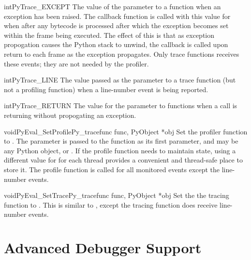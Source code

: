 \begin{cvardesc}{int}{PyTrace_EXCEPT}
  The value of the  parameter to a 
  function when an exception has been raised.  The callback function
  is called with this value for  when after any bytecode is
  processed after which the exception becomes set within the frame
  being executed.  The effect of this is that as exception propogation
  causes the Python stack to unwind, the callback is called upon
  return to each frame as the exception propagates.  Only trace
  functions receives these events; they are not needed by the
  profiler.
\end{cvardesc}

\begin{cvardesc}{int}{PyTrace_LINE}
  The value passed as the  parameter to a trace function
  (but not a profiling function) when a line-number event is being
  reported.
\end{cvardesc}

\begin{cvardesc}{int}{PyTrace_RETURN}
  The value for the  parameter to 
  functions when a call is returning without propogating an exception.
\end{cvardesc}

\begin{cfuncdesc}{void}{PyEval_SetProfile}{Py_tracefunc func, PyObject *obj}
  Set the profiler function to .  The  parameter is
  passed to the function as its first parameter, and may be any Python
  object, or \NULL.  If the profile function needs to maintain state,
  using a different value for  for each thread provides a
  convenient and thread-safe place to store it.  The profile function
  is called for all monitored events except the line-number events.
\end{cfuncdesc}

\begin{cfuncdesc}{void}{PyEval_SetTrace}{Py_tracefunc func, PyObject *obj}
  Set the the tracing function to .  This is similar to
  , except the tracing function does
  receive line-number events.
\end{cfuncdesc}


\section{Advanced Debugger Support \label{advanced-debugging}}

